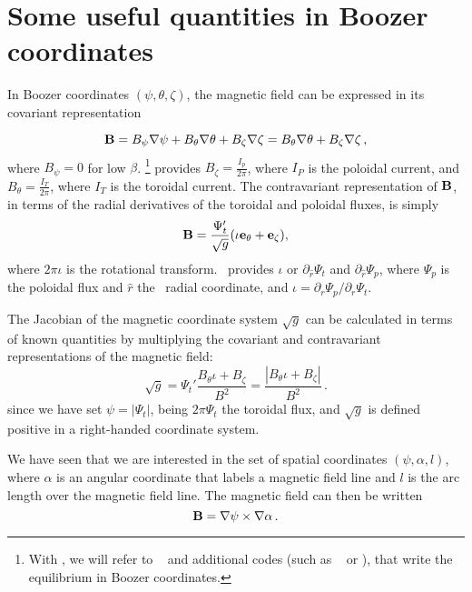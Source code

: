 \section{Some useful quantities in Boozer coordinates}\label{SEC_USEFUL}

In Boozer coordinates $(\psi, \theta, \zeta)$, the magnetic field can be expressed in its covariant representation

\begin{equation}
\mathbf{B} = B_\psi\mathbf{\nabla\psi} + B_\theta\mathbf{\nabla \theta} + B_\zeta\mathbf{\nabla \zeta} = B_\theta\mathbf{\nabla \theta}+ B_\zeta\mathbf{\nabla \zeta}\,,
\end{equation}
where $B_\psi=0$ for low $\beta$. \VMEC\footnote{With \VMEC, we will refer to \VMEC~\citep{hirshman1983vmec} and additional codes (such as \BOOZERXFORM~\citep{sanchez2000boozerxform} or \COTRANS), that write the equilibrium in Boozer coordinates.} provides $B_\zeta = \frac{I_p}{2\pi}$, where $I_P$ is the poloidal current, and $B_\theta = \frac{I_T}{2\pi}$, where $I_T$ is the toroidal current. The contravariant representation of $\mathbf{B}$, in terms of the radial derivatives of the toroidal and poloidal fluxes, is simply
\begin{equation}
\mathbf{B} = \frac{\Psi_t'}{\sqrt{g}}(\iota\mathbf{e}_\theta + \mathbf{e}_\zeta),\label{EQ_CONTRAV}
\end{equation}
where $2\pi\iota$ is the rotational transform. \VMEC~provides $\iota$ or $\partial_{\hat{r}}\Psi_t$ and $\partial_{\hat{r}}\Psi_p$, where $\Psi_p$ is the poloidal flux and $\hat{r}$ the \DKES~radial coordinate, and $\iota=\partial_r\Psi_p/\partial_r\Psi_t$.


The Jacobian of the magnetic coordinate system $\sqrt{g}$ can be calculated in terms of known quantities by multiplying the covariant and contravariant representations of the magnetic field:
\begin{equation}
\sqrt{g} = \Psi_t'\frac{B_\theta\iota + B_\zeta}{B^2} = \frac{|B_\theta\iota + B_\zeta|}{B^2} \,.
\end{equation}
since we have set $\psi=|\Psi_t|$, being $2\pi\Psi_t$ the toroidal flux, and $\sqrt{g}$ is defined positive in a right-handed coordinate system. 

We have seen that we are interested in the set of spatial coordinates $(\psi, \alpha, l)$, where $\alpha$ is an angular coordinate that labels a magnetic field line and $l$ is the arc length over the magnetic field line. The magnetic field can then be written
\begin{equation}
\mathbf{B} = \nabla\psi\times\nabla\alpha\,.
\end{equation}

